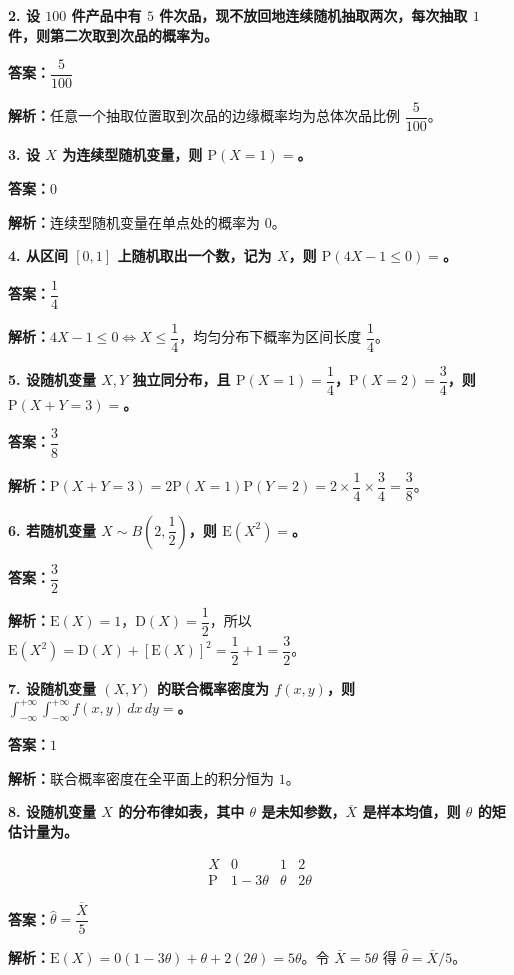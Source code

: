 ﻿\documentclass[UTF8,11pt,a4paper]{ctexart}
\newcommand{\Pp}{\mathrm{P}}
\newcommand{\E}{\mathrm{E}}
\newcommand{\D}{\mathrm{D}}
\newcommand{\Ans}[1]{\par\textbf{答案：}#1\par}
\newcommand{\Ana}[1]{\par\textbf{解析：}#1\par\medskip}
\newcommand{\Q}[1]{\par\textbf{#1}\par}
\begin{document}
\Q{2. 设 $100$ 件产品中有 $5$ 件次品，现不放回地连续随机抽取两次，每次抽取 $1$ 件，则第二次取到次品的概率为\underline{\hspace{2cm}}。}
\Ans{$\dfrac5{100}$}
\Ana{任意一个抽取位置取到次品的边缘概率均为总体次品比例 $\dfrac5{100}$。}

\Q{3. 设 $X$ 为连续型随机变量，则 $\Pp(X=1)=$\underline{\hspace{2cm}}。}
\Ans{$0$}
\Ana{连续型随机变量在单点处的概率为 $0$。}

\Q{4. 从区间 $[0,1]$ 上随机取出一个数，记为 $X$，则 $\Pp(4X-1\le0)=$\underline{\hspace{2cm}}。}
\Ans{$\dfrac14$}
\Ana{$4X-1\le0\Leftrightarrow X\le\dfrac14$，均匀分布下概率为区间长度 $\dfrac14$。}

\Q{5. 设随机变量 $X,Y$ 独立同分布，且 $\Pp(X=1)=\dfrac14$，$\Pp(X=2)=\dfrac34$，则 $\Pp(X+Y=3)=$\underline{\hspace{2cm}}。}
\Ans{$\dfrac38$}
\Ana{$\Pp(X+Y=3)=2\Pp(X=1)\Pp(Y=2)=2\times\dfrac14\times\dfrac34=\dfrac38$。}

\Q{6. 若随机变量 $X\sim B\left(2,\dfrac12\right)$，则 $\E(X^2)=$\underline{\hspace{2cm}}。}
\Ans{$\dfrac32$}
\Ana{$\E(X)=1$，$\D(X)=\dfrac12$，所以 $\E(X^2)=\D(X)+[\E(X)]^2=\dfrac12+1=\dfrac32$。}

\Q{7. 设随机变量 $(X,Y)$ 的联合概率密度为 $f(x,y)$，则 $\displaystyle\int_{-\infty}^{+\infty}\int_{-\infty}^{+\infty}f(x,y)\,dx\,dy=$\underline{\hspace{2cm}}。}
\Ans{$1$}
\Ana{联合概率密度在全平面上的积分恒为 $1$。}

\Q{8. 设随机变量 $X$ 的分布律如表，其中 $\theta$ 是未知参数，$\overline X$ 是样本均值，则 $\theta$ 的矩估计量为\underline{\hspace{2cm}}。}
\[
\begin{array}{c|ccc}X&0&1&2\\\hline \Pp&1-3\theta&\theta&2\theta\end{array}
\]
\Ans{$\hat\theta=\dfrac{\overline X}{5}$}
\Ana{$\E(X)=0(1-3\theta)+\theta+2(2\theta)=5\theta$。令 $\overline X=5\theta$ 得 $\hat\theta=\overline X/5$。}
\end{document}
